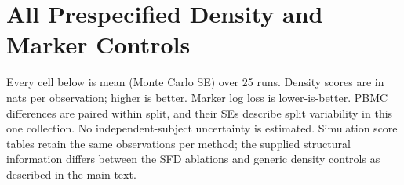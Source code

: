 \section{All Prespecified Density and Marker Controls}
\label{app:controls}
Every cell below is mean (Monte Carlo SE) over 25 runs. Density scores are
in nats per observation; higher is better. Marker log loss is lower-is-better.
PBMC differences are paired within split, and their SEs describe split
variability in this one collection. No independent-subject uncertainty is
estimated. Simulation score tables retain the same observations per method;
the supplied structural information differs between the SFD ablations and
generic density controls as described in the main text.

\begingroup
\let\paragraph\subsubsection

\endgroup


